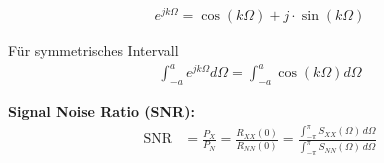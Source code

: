 \begin{align}
e^{j k \Omega} = \cos(k \Omega) + j \cdot \sin(k \Omega)
\end{align}

Für symmetrisches Intervall
\begin{align}
\int_{-a}^{a} e^{j k \Omega} d\Omega = \int_{-a}^{a} \cos(k \Omega) d\Omega
\end{align}

\textbf{Signal Noise Ratio (SNR):}
\begin{align}
\text{SNR} &= \frac{P_X}{P_N} = \frac{R_{XX}(0)}{R_{NN}(0)} = \frac{\int_{-\pi}^{\pi} S_{XX}(\Omega) \, d\Omega}{\int_{-\pi}^{\pi} S_{NN}(\Omega) \, d\Omega}\\
\end{align}
